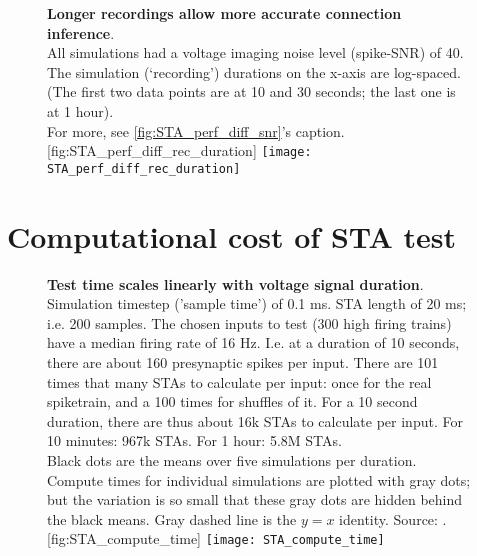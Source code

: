 \begin{figure}
    \begin{sidecaption}
        {\textbf{Longer recordings allow more accurate connection inference}.\\
        All simulations had a voltage imaging noise level (spike-SNR) of 40.\\
        The simulation (`recording') durations on the x-axis are log-spaced. (The first two data points are at 10 and 30 seconds; the last one is at 1 hour). \\
        For more, see \cref{fig:STA_perf_diff_snr}'s caption.}
        [fig:STA_perf_diff_rec_duration]
        \texttt{[image: STA\_perf\_diff\_rec\_duration]}
    \end{sidecaption}
\end{figure}


\FloatBarrier
\section{Computational cost of STA test}

\begin{figure}
    \begin{sidecaption}
        {\textbf{Test time scales linearly with voltage signal duration}.\\
        Simulation timestep ('sample time') of 0.1 ms. STA length of 20 ms; i.e. 200 samples.
        The chosen inputs to test (300 high firing trains) have a median firing rate of 16 Hz. I.e. at a duration of 10 seconds, there are about 160 presynaptic spikes per input. There are 101 times that many STAs to calculate per input: once for the real spiketrain, and a 100 times for shuffles of it. For a 10 second duration, there are thus about 16k STAs to calculate per input.
        For 10 minutes: 967k STAs. For 1 hour: 5.8M STAs.\\
        Black dots are the means over five simulations per duration. Compute times for individual simulations are plotted with gray dots; but the variation is so small that these gray dots are hidden behind the black means. Gray dashed line is the $y = x$ identity.  Source: .}
        [fig:STA_compute_time]
        \texttt{[image: STA\_compute\_time]}
    \end{sidecaption}
\end{figure}

